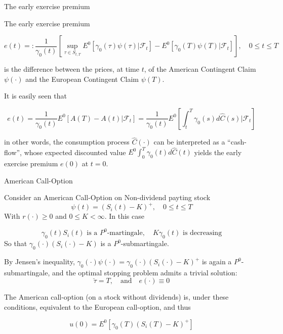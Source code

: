 \documentclass{beamer}
\begin{document}
\begin{frame}{The early exercise premium}

    {\footnotesize \footnotesize
     The early exercise premium

    \[
    e(t) =: \frac{1}{\gamma_0(t)} \left[ \sup_{\tau \in S_{t,T}} E^0[\gamma_0(\tau)\psi(\tau)|\mathcal{F}_t] - 
    E^0[\gamma_0(T)\psi(T)|\mathcal{F}_t] \right], \quad 0 \leq t \leq T
    \]

    is the difference between the prices, at time \(t\), of the American Contingent Claim \(\psi(\cdot)\)
    and the European Contingent Claim \(\psi(T)\). 
    
     \pause It is easily seen that

    \[
    e(t) = \frac{1}{\gamma_0(t)} E^0[A(T) - A(t)|\mathcal{F}_t] = \frac{1}{\gamma_0(t)} E^0 \left[ \int_t^T 
    \gamma_0(s)d\hat{C}(s)|\mathcal{F}_t\right]
    \]

    in other words, the consumption process \(\hat{C}(\cdot)\) can be interpreted as a ``cash-flow'', 
    whose expected discounted value \(E^0 \int_0^T \gamma_0(t)d\hat{C}(t)\)
    yields the early exercise premium \(e(0)\) at \(t = 0\).
    }

    
\end{frame}
       
\begin{frame}{American Call-Option}

    {\footnotesize \footnotesize
    Consider an American Call-Option on Non-dividend payting stock
    \[
    \psi(t) = (S_i(t) - K)^+, \quad 0 \leq t \leq T
    \]
    With \(r(\cdot) \geq 0\) and \(0 \leq K < \infty\). In this case

    \[
    \gamma_0(t)S_i(t) \text{ is a } P^0\text{-martingale}, \quad K\gamma_0(t) \text{ is decreasing}
    \]
    So that \(\gamma_0(\cdot)(S_i(\cdot) - K)\) is a \(P^0\)-submartingale. 
    
     \pause By Jensen's inequality, \(\gamma_0(\cdot)\psi(\cdot) = 
    \gamma_0(\cdot)(S_i(\cdot)-K)^+\) is again a \(P^0\)-submartingale, 
    and the optimal stopping problem admits a trivial solution:
    \[
    \check{\tau} = T, \quad \text{and} \quad e(\cdot) \equiv 0
    \]

    The American call-option (on a stock without dividends) is, under these conditions, equivalent to the European call-option, and thus

    \[
    u(0) = E^0[\gamma_0(T)(S_i(T)-K)^+]
    \]

    }

    
\end{frame}   
\end{document}

